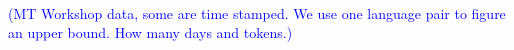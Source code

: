 \documentclass{article}
\newcommand{\todo}[1]{\textcolor{blue}{(#1)}}
\begin{document}
\\

\todo{MT Workshop data, some are time stamped.  We use one language pair to figure an upper bound. How many days and tokens.}\\

\end{document}
